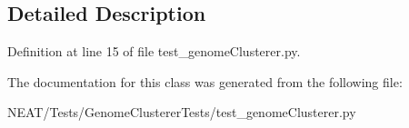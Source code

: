 \subsection{Detailed Description}


Definition at line 15 of file test\+\_\+genome\+Clusterer.\+py.



The documentation for this class was generated from the following file\+:\begin{DoxyCompactItemize}
\item 
N\+E\+A\+T/\+Tests/\+Genome\+Clusterer\+Tests/test\+\_\+genome\+Clusterer.\+py\end{DoxyCompactItemize}
